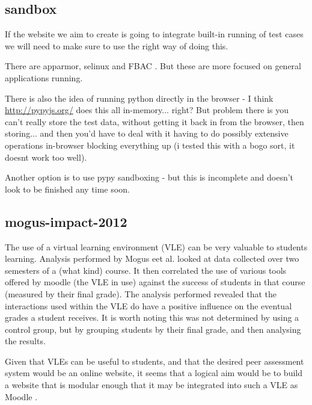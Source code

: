 \documentclass[a4paper,11pt]{report}
\begin{document}
\subsection{sandbox}
If the website we aim to create is going to integrate built-in running of test cases we will need to make sure to use the right way of doing this.\par
There are apparmor, selinux and FBAC \cite{schreuders_empowering_2011}. But these are more focused on general applications running.\par
There is also the idea of running python directly in the browser - I think \url{http://pypyjs.org/} does this all in-memory... right? But problem there is you can't really store the test data, without getting it back in from the browser, then storing... and then you'd have to deal with it having to do possibly extensive operations in-browser blocking everything up (i tested this with a bogo sort, it doesnt work too well).\par
Another option is to use pypy sandboxing - but this is incomplete and doesn't look to be finished any time soon.\par

\subsection{mogus-impact-2012}
The use of a virtual learning environment (VLE) can be very valuable to students learning. Analysis performed by Mogus eet al. \cite{mogus_impact_2012} looked at data collected over two semesters of a (what kind) course. It then correlated the use of various tools offered by moodle (the VLE in use) against the success of students in that course (measured by their final grade). The analysis performed revealed that the interactions used within the VLE do have a positive influence on the eventual grades a student receives. It is worth noting this was not determined by using a control group, but by grouping students by their final grade, and then analysing the results.\par
Given that VLEs can be useful to students, and that the desired peer assessment system would be an online website, it seems that a logical aim would be to build a website that is modular enough that it may be integrated into such a VLE as Moodle \cite{moodle_about_2016}.
\end{document}
